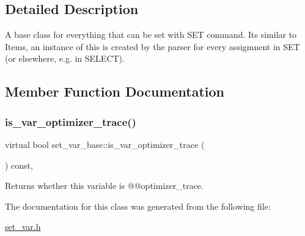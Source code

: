 \subsection{Detailed Description}
A base class for everything that can be set with S\+ET command. It\textquotesingle{}s similar to Items, an instance of this is created by the parser for every assigmnent in S\+ET (or elsewhere, e.\+g. in S\+E\+L\+E\+CT). 

\subsection{Member Function Documentation}
\mbox{\label{classset__var__base_aade139353a2e5110a47933bb349f3063}} 
\subsubsection{\texorpdfstring{is\+\_\+var\+\_\+optimizer\+\_\+trace()}{is\_var\_optimizer\_trace()}}
{\footnotesize\ttfamily virtual bool set\+\_\+var\+\_\+base\+::is\+\_\+var\+\_\+optimizer\+\_\+trace (\begin{DoxyParamCaption}{ }\end{DoxyParamCaption}) const\hspace{0.3cm}{\ttfamily [inline]}, {\ttfamily [virtual]}}

\begin{DoxyReturn}{Returns}
whether this variable is @@optimizer\+\_\+trace. 
\end{DoxyReturn}


The documentation for this class was generated from the following file\+:\begin{DoxyCompactItemize}
\item 
\mbox{\hyperlink{set__var_8h}{set\+\_\+var.\+h}}\end{DoxyCompactItemize}

